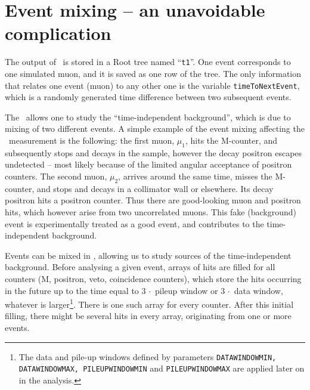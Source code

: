 \documentclass[twoside]{dis04}
\begin{document}
\section{Event mixing -- an unavoidable complication}
\label{sec:eventMixing}
The output of \musrSim\ is stored in a Root tree named ``{\tt t1}''.  One event corresponds
to one simulated muon, and it is saved as one row of the tree.  The only information that
relates one event (muon) to any other one is the variable {\tt timeToNextEvent}, 
which is a randomly generated time difference between two subsequent events.

The \musrSimAna\ allows one to study the ``time-independent background'', which is
due to mixing of two different events. A simple example of the event mixing affecting 
the \musr\ measurement is the following:  the first muon, $\mu_1$, hits the M-counter,
and subsequently stops and decays in the sample, however the decay positron escapes
undetected -- most likely because of the limited angular acceptance of positron counters.
The second muon, $\mu_2$,  arrives around the same time, misses the M-counter, 
and stops and decays in a collimator wall or elsewhere. 
Its decay positron hits a positron counter.  Thus there are good-looking muon and positron
hits,  which however arise from two uncorrelated muons. 
This fake (background) event is experimentally treated as a good event,
and contributes to the time-independent background.

Events can be mixed in \musrSimAna, allowing us to study sources of
the time-independent background.
Before analysing  a given event, arrays of hits are filled
for all counters (M, positron, veto, coincidence counters), which store the hits occurring in the
future up to the time equal to $ 3\, \cdot $ pileup window or $ 3\, \cdot $ data window,
whatever is larger\footnote{The data and pile-up windows defined by parameters 
{\tt DATAWINDOWMIN, DATAWINDOWMAX, PILEUPWINDOWMIN} and {\tt PILEUPWINDOWMAX} 
are applied later on in the analysis.}. 
There is one such array for every counter.  After this initial filling,
there might be several hits in every array, originating from one or more events.
\end{document}
